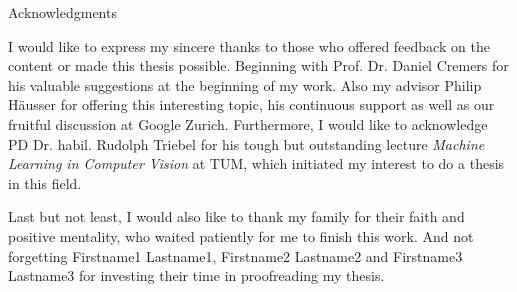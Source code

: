 \thispagestyle{empty}

\vspace*{20mm}

\begin{center}
{ Acknowledgments}
\end{center}

\vspace{10mm}

I would like to express my sincere thanks to those who offered feedback on the content or made this thesis possible. Beginning with Prof. Dr. Daniel Cremers for his valuable suggestions at the beginning of my work. Also my advisor Philip Häusser for offering this interesting topic, his continuous support as well as our fruitful discussion at Google Zurich. Furthermore, I would like to acknowledge PD Dr. habil. Rudolph Triebel for his tough but outstanding lecture \textit{Machine Learning in Computer Vision} at TUM, which initiated my interest to do a thesis in this field.


Last but not least, I would also like to thank my family for their faith and positive mentality, who waited patiently for me to finish this work. And not forgetting Firstname1 Lastname1, Firstname2 Lastname2 and Firstname3 Lastname3 for investing their time in proofreading my thesis.

\cleardoublepage{}

